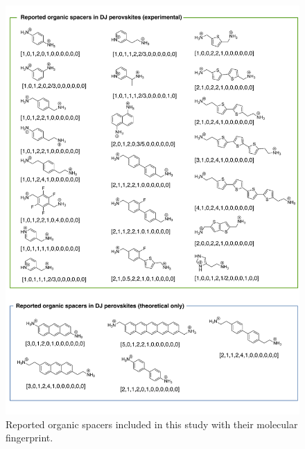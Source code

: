 \begin{figure}[htbp]
    \centering
    \includegraphics[width=\textwidth]{figures/methodology/figure3-4.pdf}
    \caption{Reported organic spacers included in this study with their molecular fingerprint.}
    \label{fig:figure3.4}
\end{figure}


